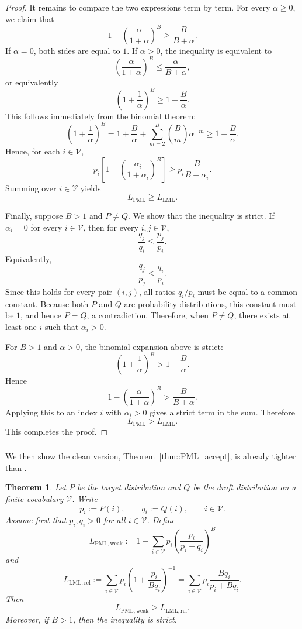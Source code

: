 \documentclass{article}
\theoremstyle{plain}
\newtheorem{theorem}{Theorem}[section]
\theoremstyle{definition}
\begin{document}
\begin{proof}
It remains to compare the two expressions term by term. For every
$\alpha\ge 0$, we claim that
\[
    1-\left(\frac{\alpha}{1+\alpha}\right)^B
    \ge
    \frac{B}{B+\alpha}.
\]
If $\alpha=0$, both sides are equal to $1$. If $\alpha>0$, the inequality is
equivalent to
\[
    \left(\frac{\alpha}{1+\alpha}\right)^B
    \le
    \frac{\alpha}{B+\alpha},
\]
or equivalently
\[
    \left(1+\frac{1}{\alpha}\right)^B
    \ge
    1+\frac{B}{\alpha}.
\]
This follows immediately from the binomial theorem:
\[
    \left(1+\frac{1}{\alpha}\right)^B
    =
    1+\frac{B}{\alpha}
    +\sum_{m=2}^B \binom{B}{m}\alpha^{-m}
    \ge
    1+\frac{B}{\alpha}.
\]
Hence, for each $i\in\mathcal V$,
\[
    p_i
    \left[
        1-\left(\frac{\alpha_i}{1+\alpha_i}\right)^B
    \right]
    \ge
    p_i\frac{B}{B+\alpha_i}.
\]
Summing over $i\in\mathcal V$ yields
\[
    L_{\mathrm{PML}}
    \ge
    L_{\mathrm{LML}}.
\]

Finally, suppose $B>1$ and $P\neq Q$. We show that the inequality is strict.
If $\alpha_i=0$ for every $i\in\mathcal V$, then for every $i,j\in\mathcal V$,
\[
    \frac{q_j}{q_i}
    \le
    \frac{p_j}{p_i}.
\]
Equivalently,
\[
    \frac{q_j}{p_j}
    \le
    \frac{q_i}{p_i}.
\]
Since this holds for every pair $(i,j)$, all ratios $q_i/p_i$ must be equal to
a common constant. Because both $P$ and $Q$ are probability distributions, this
constant must be $1$, and hence $P=Q$, a contradiction. Therefore, when
$P\neq Q$, there exists at least one $i$ such that $\alpha_i>0$.

For $B>1$ and $\alpha>0$, the binomial expansion above is strict:
\[
    \left(1+\frac{1}{\alpha}\right)^B
    >
    1+\frac{B}{\alpha}.
\]
Hence
\[
    1-\left(\frac{\alpha}{1+\alpha}\right)^B
    >
    \frac{B}{B+\alpha}.
\]
Applying this to an index $i$ with $\alpha_i>0$ gives a strict term in the
sum. Therefore
\[
    L_{\mathrm{PML}}
    >
    L_{\mathrm{LML}}.
\]
This completes the proof.
\end{proof}




\subsubsection{}

We then show the clean version,  Theorem~\ref{thm::PML_accept}, is already tighter than \citep[Eq. (4)]{rowan2025list}. 
	
	\begin{theorem}
\label{thm::PML_weak_dominates_relaxed_LML}
Let $P$ be the target distribution and $Q$ be the draft distribution on a finite
vocabulary $\mathcal V$. Write
\[
    p_i:=P(i),\qquad q_i:=Q(i),\qquad i\in\mathcal V.
\]
Assume first that $p_i,q_i>0$ for all $i\in\mathcal V$. Define
\[
    L_{\mathrm{PML,weak}}
    :=
    1-\sum_{i\in\mathcal V}
    p_i
    \left(
        \frac{p_i}{p_i+q_i}
    \right)^B
\]
and
\[
    L_{\mathrm{LML,rel}}
    :=
    \sum_{i\in\mathcal V}
    p_i
    \left(
        1+\frac{p_i}{Bq_i}
    \right)^{-1}
    =
    \sum_{i\in\mathcal V}
    p_i
    \frac{Bq_i}{p_i+Bq_i}.
\]
Then
\[
    L_{\mathrm{PML,weak}}
    \ge
    L_{\mathrm{LML,rel}}.
\]
Moreover, if $B>1$, then the inequality is strict.
\end{theorem}
\end{document}
